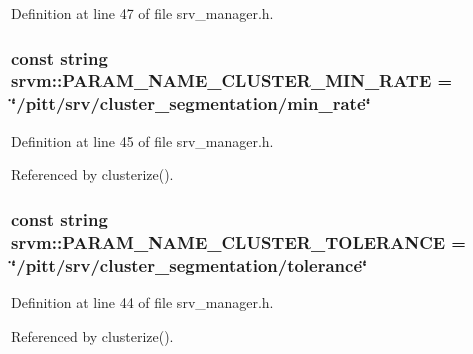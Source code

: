 Definition at line 47 of file srv\-\_\-manager.\-h.

\hypertarget{namespacesrvm_a68216326c13293ff70084f03bb4efa98}{
\subsubsection[{P\-A\-R\-A\-M\-\_\-\-N\-A\-M\-E\-\_\-\-C\-L\-U\-S\-T\-E\-R\-\_\-\-M\-I\-N\-\_\-\-R\-A\-T\-E}]{\setlength{\rightskip}{0pt plus 5cm}const string srvm\-::\-P\-A\-R\-A\-M\-\_\-\-N\-A\-M\-E\-\_\-\-C\-L\-U\-S\-T\-E\-R\-\_\-\-M\-I\-N\-\_\-\-R\-A\-T\-E = \char`\"{}/pitt/srv/cluster\-\_\-segmentation/min\-\_\-rate\char`\"{}}}\label{namespacesrvm_a68216326c13293ff70084f03bb4efa98}


Definition at line 45 of file srv\-\_\-manager.\-h.



Referenced by clusterize().

\hypertarget{namespacesrvm_a606c20312640e9cc8710e4d43f0cb167}{
\subsubsection[{P\-A\-R\-A\-M\-\_\-\-N\-A\-M\-E\-\_\-\-C\-L\-U\-S\-T\-E\-R\-\_\-\-T\-O\-L\-E\-R\-A\-N\-C\-E}]{\setlength{\rightskip}{0pt plus 5cm}const string srvm\-::\-P\-A\-R\-A\-M\-\_\-\-N\-A\-M\-E\-\_\-\-C\-L\-U\-S\-T\-E\-R\-\_\-\-T\-O\-L\-E\-R\-A\-N\-C\-E = \char`\"{}/pitt/srv/cluster\-\_\-segmentation/tolerance\char`\"{}}}\label{namespacesrvm_a606c20312640e9cc8710e4d43f0cb167}


Definition at line 44 of file srv\-\_\-manager.\-h.



Referenced by clusterize().

